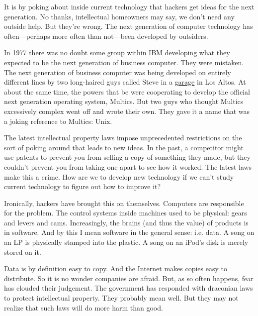 It is by poking
                  about inside current technology that hackers get ideas for the
                  next generation. No thanks, intellectual homeowners may say,
                  we don't need any outside help. But they're wrong. The next
                  generation of computer technology has often---perhaps more
                  often than not---been developed by outsiders.

In
                  1977 there was no doubt some group within IBM developing what
                  they expected to be the next generation of business computer.
                  They were mistaken. The next generation of business computer
                  was being developed on entirely different lines by two
                  long-haired guys called Steve in a
                  \href{http://www.paulgraham.com/garage.html}{garage} in Los Altos. At about the
                  same time, the powers that be were cooperating to develop the
                  official next generation operating system, Multics. But two
                  guys who thought Multics excessively complex went off and
                  wrote their own. They gave it a name that was a joking
                  reference to Multics: Unix.

The latest intellectual
                  property laws impose unprecedented restrictions on the sort of
                  poking around that leads to new ideas. In the past, a
                  competitor might use patents to prevent you from selling a
                  copy of something they made, but they couldn't prevent you
                  from taking one apart to see how it worked. The latest laws
                  make this a crime. How are we to develop new technology if we
                  can't study current technology to figure out how to improve
                  it?

Ironically, hackers have brought this on
                  themselves. Computers are responsible for the problem. The
                  control systems inside machines used to be physical: gears and
                  levers and cams. Increasingly, the brains (and thus the value)
                  of products is in software. And by this I mean software in the
                  general sense: i.e. data. A song on an LP is physically
                  stamped into the plastic. A song on an iPod's disk is merely
                  stored on it.

Data is by definition easy to copy.
                  And the Internet makes copies easy to distribute. So it is no
                  wonder companies are afraid. But, as so often happens, fear
                  has clouded their judgement. The government has responded with
                  draconian laws to protect intellectual property. They probably
                  mean well. But they may not realize that such laws will do
                  more harm than good.

